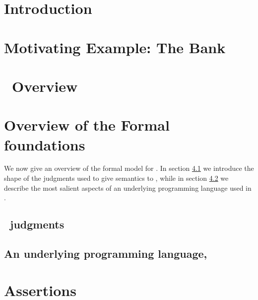 \documentclass[acmsmall]{acmart}
\begin{document}
\maketitle

\renewcommand{\shortauthors}{S. Drossopoulou, J. Noble, et al.}


\section{Introduction}
%


\section{Motivating Example: The Bank}
\label{sect:motivate:Bank}




\section{\Chainmail\ Overview}
\label{sect:chainmail}



\section{Overview of the Formal foundations}
\label{sect:formal}
We now give an overview of the formal model for \Chainmail. In section \ref{sect:overviewmodel} we 
introduce  the shape of the judgments used to give semantics to \Chainmail, while in section \ref{sect:PL} 
we describe the most salient aspects of an underlying programming language used in \Chainmail.

\subsection{\Chainmail\ judgments}
\label{sect:overviewmodel}


\subsection{An underlying programming language, \LangOO}
\label{sect:PL}


\section{Assertions}
\label{sect:assertions}

\end{document}
